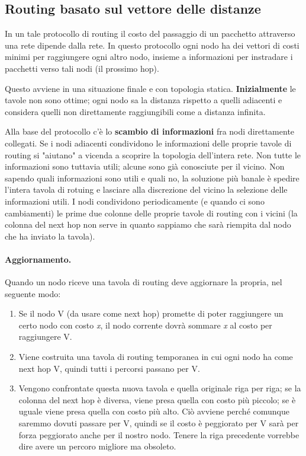     \subsection{Routing basato sul vettore delle distanze}
        In un tale protocollo di routing il costo del passaggio di un pacchetto attraverso una rete dipende dalla rete. In questo protocollo ogni nodo ha dei vettori di costi minimi per raggiungere ogni altro nodo, insieme a informazioni per instradare i pacchetti verso tali nodi (il prossimo hop).
        
        Questo avviene in una situazione finale e con topologia statica. \textbf{Inizialmente} le tavole non sono ottime; ogni nodo sa la distanza rispetto a quelli adiacenti e considera quelli non direttamente raggiungibili come a distanza infinita.
        
        Alla base del protocollo c'è lo \textbf{scambio di informazioni} fra nodi direttamente collegati. Se i nodi adiacenti condividono le informazioni delle proprie tavole di routing si "aiutano" a vicenda a scoprire la topologia dell'intera rete. Non tutte le informazioni sono tuttavia utili; alcune sono già conosciute per il vicino. Non sapendo quali informazioni sono utili e quali no, la soluzione più banale è spedire l'intera tavola di rotuing e lasciare alla discrezione del vicino la selezione delle informazioni utili. I nodi condividono periodicamente (e quando ci sono cambiamenti) le prime due colonne delle proprie tavole di routing con i vicini (la colonna del next hop non serve in quanto sappiamo che sarà riempita dal nodo che ha inviato la tavola).
        
        \paragraph{Aggiornamento.}
            Quando un nodo riceve una tavola di routing deve aggiornare la propria, nel seguente modo:
            \begin{enumerate}
                \item Se il nodo V (da usare come next hop) promette di poter raggiungere un certo nodo con costo \textit{x}, il nodo corrente dovrà sommare \textit{x} al costo per raggiungere V.
                
                \item Viene costruita una tavola di routing temporanea in cui ogni nodo ha come next hop V, quindi tutti i percorsi passano per V.
                
                \item Vengono confrontate questa nuova tavola e quella originale riga per riga; se la colonna del next hop è diversa, viene presa quella con costo più piccolo; se è uguale viene presa quella con costo più alto. Ciò avviene perché comunque saremmo dovuti passare per V, quindi se il costo è peggiorato per V sarà per forza peggiorato anche per il nostro nodo. Tenere la riga precedente vorrebbe dire avere un percoro migliore ma obsoleto.
            \end{enumerate}
            
